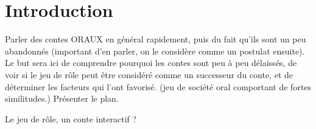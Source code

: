\section*{Introduction}

Parler des contes ORAUX en général rapidement, puis du fait qu'ils sont un peu abandonnés (important d'en parler, on le considère comme un postulat ensuite). Le but sera ici de comprendre pourquoi les contes sont peu à peu délaissés, de voir si le jeu de rôle peut être considéré comme un successeur du conte, et de déterminer les facteurs qui l'ont favorisé. (jeu de société oral comportant de fortes similitudes.)
Présenter le plan.

Le jeu de rôle, un conte interactif ?

\clearpage
